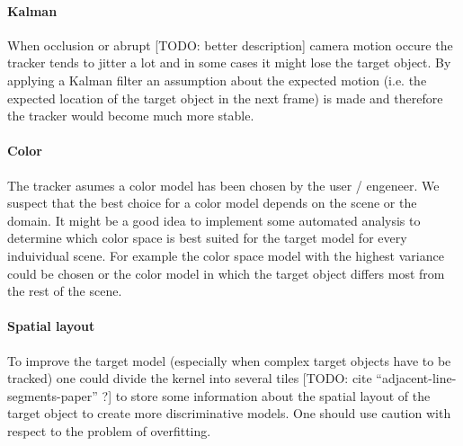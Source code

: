 \documentclass[11pt]{article}
\begin{document}
\paragraph{Kalman} When occlusion or abrupt [TODO: better description] camera
motion occure the tracker tends to jitter a lot and in some cases it might lose
the target object. By applying a Kalman filter an assumption about the expected
motion (i.e. the expected location of the target object in the next frame) is made
and therefore the tracker would become much more stable.

\paragraph{Color} The tracker asumes a color model has been chosen by the user /
engeneer. We suspect that the best choice for a color model depends on the scene
or the domain. It might be a good idea to implement some automated analysis to
determine which color space is best suited for the target model for every
induividual scene. For example the color space model with the highest variance
could be chosen or the color model in which the target object differs most from
the rest of the scene.

\paragraph{Spatial layout} To improve the target model (especially when complex
target objects have to be tracked) one could divide the kernel into several
tiles [TODO: cite ``adjacent-line-segments-paper'' ?] to store some information
about the spatial layout of the target object to create more discriminative
models. One should use caution with respect to the problem of overfitting.

\renewcommand\bibname{References}


\end{document}

